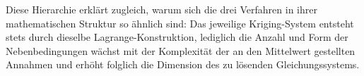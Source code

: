 Diese Hierarchie erklärt zugleich, warum sich die drei Verfahren in ihrer 
mathematischen Struktur so ähnlich sind: Das jeweilige Kriging-System 
entsteht stets durch dieselbe Lagrange-Konstruktion, lediglich die Anzahl 
und Form der Nebenbedingungen wächst mit der Komplexität der an
den Mittelwert gestellten Annahmen und erhöht folglich die Dimension 
des zu lösenden Gleichungssystems.
